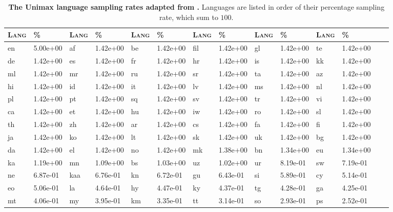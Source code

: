 \begin{table}
  \centering            %
  \scriptsize         %
  \setlength{\tabcolsep}{3pt}
\caption{\textbf{The Unimax language sampling rates adapted from \citet{chung2023unimax}.} Languages are listed in order of their percentage sampling rate, which sum to $100$.}
    \begin{tabular}{ll|ll|ll|ll|ll|ll|ll}
      \toprule
      \textsc{Lang} & \textsc{\%} & \textsc{Lang} & \textsc{\%} & \textsc{Lang} & \textsc{\%} & \textsc{Lang} & \textsc{\%} & \textsc{Lang} & \textsc{\%} & \textsc{Lang} & \textsc{\%} \\
      \midrule

en & 5.00e+00 & af & 1.42e+00 & be & 1.42e+00 & fil & 1.42e+00 & gl & 1.42e+00 & te & 1.42e+00 \\
de & 1.42e+00 & es & 1.42e+00 & fr & 1.42e+00 & hr & 1.42e+00 & is & 1.42e+00 & kk & 1.42e+00 \\
ml & 1.42e+00 & mr & 1.42e+00 & ru & 1.42e+00 & sr & 1.42e+00 & ta & 1.42e+00 & az & 1.42e+00 \\
hi & 1.42e+00 & id & 1.42e+00 & it & 1.42e+00 & lv & 1.42e+00 & ms & 1.42e+00 & nl & 1.42e+00 \\
pl & 1.42e+00 & pt & 1.42e+00 & sq & 1.42e+00 & sv & 1.42e+00 & tr & 1.42e+00 & vi & 1.42e+00 \\
ca & 1.42e+00 & et & 1.42e+00 & hu & 1.42e+00 & iw & 1.42e+00 & ro & 1.42e+00 & sl & 1.42e+00 \\
th & 1.42e+00 & zh & 1.42e+00 & ar & 1.42e+00 & cs & 1.42e+00 & fa & 1.42e+00 & fi & 1.42e+00 \\
ja & 1.42e+00 & ko & 1.42e+00 & lt & 1.42e+00 & sk & 1.42e+00 & uk & 1.42e+00 & bg & 1.42e+00 \\
da & 1.42e+00 & el & 1.42e+00 & no & 1.42e+00 & mk & 1.38e+00 & bn & 1.34e+00 & eu & 1.34e+00 \\
ka & 1.19e+00 & mn & 1.09e+00 & bs & 1.03e+00 & uz & 1.02e+00 & ur & 8.19e-01 & sw & 7.19e-01 \\
ne & 6.87e-01 & kaa & 6.76e-01 & kn & 6.72e-01 & gu & 6.43e-01 & si & 5.89e-01 & cy & 5.14e-01 \\
eo & 5.06e-01 & la & 4.64e-01 & hy & 4.47e-01 & ky & 4.37e-01 & tg & 4.28e-01 & ga & 4.25e-01 \\
mt & 4.06e-01 & my & 3.95e-01 & km & 3.35e-01 & tt & 3.14e-01 & so & 2.93e-01 & ps & 2.52e-01 \\

\end{tabular}
\end{table}
